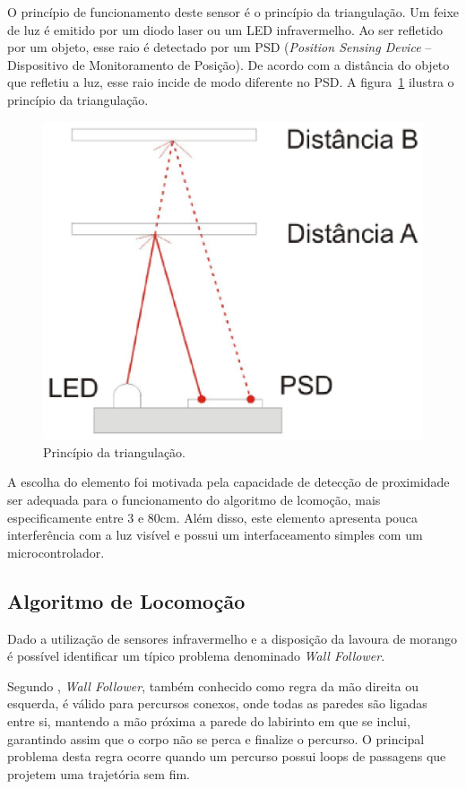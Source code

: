   O princípio de funcionamento deste sensor é o princípio da triangulação.
  Um feixe de luz é emitido por um diodo laser ou um LED infravermelho.
  Ao ser refletido por um objeto, esse raio é detectado por um PSD
  (\textit{Position Sensing Device} -- Dispositivo de Monitoramento de Posição).
  De acordo com a distância do objeto que refletiu a luz, esse raio incide
  de modo diferente no PSD. A figura~\ref{fig:infrared_func} ilustra o
  princípio da triangulação.

  \begin{figure}[!htbp]
  \begin{center}
  \includegraphics[width=.7\textwidth]{figuras/infrared_func.eps}
  \caption{\label{fig:infrared_func}Princípio da triangulação.}
  \end{center}
  \end{figure}

  A escolha do elemento foi motivada pela capacidade de detecção
  de proximidade ser adequada para o funcionamento do algoritmo
  de lcomoção, mais especificamente entre 3 e 80cm.  Além disso,
  este elemento apresenta pouca interferência com a luz visível e
  possui um interfaceamento simples com um microcontrolador.

  \subsection{Algoritmo de Locomoção}
    Dado a utilização de sensores infravermelho e a disposição da lavoura de morango
    é possível identificar um típico problema denominado \textit{Wall Follower}.

    Segundo \cite{huang2009}, \textit{Wall Follower},
    também conhecido como regra da mão direita ou esquerda, é válido para percursos conexos, onde todas as paredes são ligadas entre si, mantendo a mão próxima a parede do labirinto em
    que se inclui, garantindo assim que o corpo não se perca e finalize
    o percurso. O principal problema desta regra ocorre quando um percurso
    possui loops de passagens que projetem uma trajetória sem fim.

